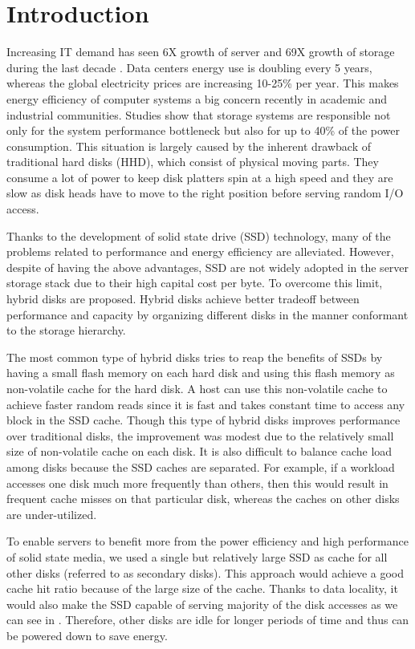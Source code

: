 \section{Introduction}
\label{intro}

Increasing IT demand has seen 6X growth of server and 69X growth of
storage during the last decade \cite{ibm_green_beyond}. Data centers
energy use is doubling every 5 years, whereas the global electricity
prices are increasing 10-25\% per year. This makes energy efficiency
of computer systems a big concern recently in academic and industrial
communities. Studies show that storage systems are responsible not
only for the system performance bottleneck but also for up to 40\% of
the power consumption\cite{storage_40}. This situation is largely
caused by the inherent drawback of traditional hard disks (HHD), which
consist of physical moving parts. They consume a lot of power to keep
disk platters spin at a high speed and they are slow as disk heads
have to move to the right position before serving random I/O access.

Thanks to the development of solid state drive (SSD) technology, many
of the problems related to performance and energy efficiency are
alleviated. However, despite of having the above advantages, SSD are
not widely adopted in the server storage stack due to their high
capital cost per byte. To overcome this limit, hybrid disks are
proposed. Hybrid disks achieve better tradeoff between performance and
capacity by organizing different disks in the manner conformant to the
storage hierarchy. 

The most common type of hybrid disks \cite{Bisson07ahybrid} tries to
reap the benefits of SSDs by having a small flash memory on each hard
disk and using this flash memory as non-volatile cache for the hard
disk. A host can use this non-volatile cache to achieve faster random
reads since it is fast and takes constant time to access any block in
the SSD cache. Though this type of hybrid disks improves performance
over traditional disks, the improvement was modest due to the
relatively small size of non-volatile cache on each disk. It is also
difficult to balance cache load among disks because the SSD caches are
separated. For example, if a workload accesses one disk much more
frequently than others, then this would result in frequent cache
misses on that particular disk, whereas the caches on other disks are
under-utilized. 

To enable servers to benefit more from the power efficiency and high
performance of solid state media, we used a single but relatively
large SSD as cache for all other disks (referred to as secondary
disks). This approach would achieve a good cache hit ratio because of
the large size of the cache. Thanks to data locality, it would also
make the SSD capable of serving majority of the disk accesses as we
can see in \cite{Debnath_SkimpyStash, Debnath_Bloomflash,
flashcache_experiments}. Therefore, other disks are idle for longer
periods of time and thus can be powered down to save energy. 

